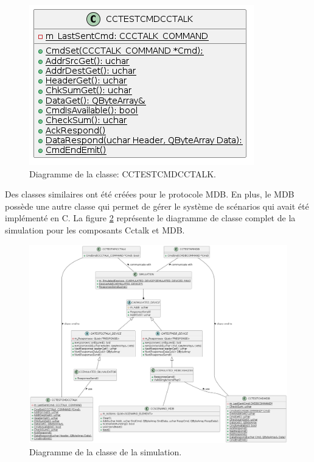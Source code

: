 \documentclass[a4paper]{article}
\begin{document}
\begin{figure}[h!]
  \begin{center}
  \includegraphics[scale=0.5]{./graphs/testcctalkcmd.png}
    \caption{Diagramme de la classe: CCTESTCMDCCTALK.}
    \label{fig:testcctalkcmd}
  \end{center}
\end{figure}

Des classes similaires ont été créées pour le protocole MDB. En plus, le MDB
possède une autre classe qui permet de gérer le système de scénarios qui avait
été implémenté en C. La figure \ref{fig:simcomplete} représente le diagramme de
classe complet de la simulation pour les composants Cctalk et MDB.

\begin{figure}[h!]
  \begin{center}
  \includegraphics[scale=0.3]{./graphs/simulation.png}
    \caption{Diagramme de la classe de la simulation.}
    \label{fig:simcomplete}
  \end{center}
\end{figure}
\end{document}
